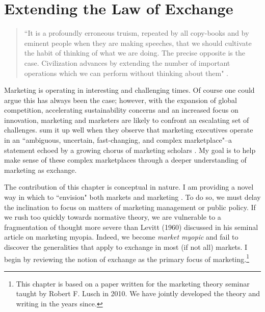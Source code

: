 \chapter{Extending the Law of Exchange\label{law}}

\begin{small}
\begin{quote}
``It is a profoundly erroneous truism, repeated by all copy-books and by eminent people when they are making speeches, that we should cultivate the habit of thinking of what we are doing. The precise opposite is the case. Civilization advances by extending the number of important operations which we can perform without thinking about them" \citep[p. 61]{whitehead1911}.
\end{quote}
\end{small}

Marketing is operating in interesting and challenging times. Of course one could argue this has always been the case; however, with the expansion of global competition, accelerating sustainability concerns and an increased focus on innovation, marketing and marketers are likely to confront an escalating set of challenges. \citet[p. 1]{reibstein2009} sum it up well when they observe that marketing executives operate in an ``ambiguous, uncertain, fast-changing, and complex marketplace"--a statement echoed by a growing chorus of marketing scholars \citep[see e.g.][]{achrol1999, achrol2012, webster1992}. My goal is to help make sense of these complex marketplaces through a deeper understanding of marketing as exchange.

The contribution of this chapter is conceptual in nature. I am providing a novel way in which to ``envision" both markets and marketing \citep{macInnis2011}. To do so, we must delay the inclination to focus on matters of marketing management or public policy. If we rush too quickly towards normative theory, we are vulnerable to a fragmentation of thought more severe than Levitt (1960) discussed in his seminal article on marketing myopia. Indeed, we become \emph{market myopic} and fail to discover the generalities that apply to exchange in most (if not all) markets. I begin by reviewing the notion of exchange as the primary focus of marketing.\footnote{This chapter is based on a paper written for the marketing theory seminar taught by Robert F. Lusch in 2010. We have jointly developed the theory and writing in the years since.}

